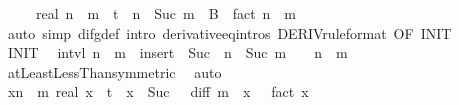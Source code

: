 \begin{isabellebody}
\ \ \ \ \ real\ {\isacharparenleft}{\kern0pt}n\ {\isacharminus}{\kern0pt}\ m{\isacharparenright}{\kern0pt}\ {\isacharasterisk}{\kern0pt}\ t\ {\isacharcircum}{\kern0pt}\ {\isacharparenleft}{\kern0pt}n\ {\isacharminus}{\kern0pt}\ Suc\ m{\isacharparenright}{\kern0pt}\ {\isacharasterisk}{\kern0pt}\ B\ {\isacharslash}{\kern0pt}\ fact\ {\isacharparenleft}{\kern0pt}n\ {\isacharminus}{\kern0pt}\ m{\isacharparenright}{\kern0pt}{\isacharparenright}{\kern0pt}{\isachardoublequoteclose}\isanewline
\ \ \ \ \isamarkupfalse%
\ {\isacharparenleft}{\kern0pt}auto\ simp{\isacharcolon}{\kern0pt}\ difg{\isacharunderscore}{\kern0pt}def\ intro{\isacharbang}{\kern0pt}{\isacharcolon}{\kern0pt}\ derivative{\isacharunderscore}{\kern0pt}eq{\isacharunderscore}{\kern0pt}intros\ DERIV{\isacharbrackleft}{\kern0pt}rule{\isacharunderscore}{\kern0pt}format{\isacharcomma}{\kern0pt}\ OF\ INIT{}{\isacharbrackright}{\kern0pt}{\isacharparenright}{\kern0pt}\isanewline
\ \ \isamarkupfalse%
\isanewline
\ \ \isamarkupfalse%
\ INIT{}\ \isamarkupfalse%
\ intvl{\isacharcolon}{\kern0pt}\ {\isachardoublequoteopen}{\isacharbraceleft}{\kern0pt}{\isachardot}{\kern0pt}{\isachardot}{\kern0pt}{\isacharless}{\kern0pt}n\ {\isacharminus}{\kern0pt}\ m{\isacharbraceright}{\kern0pt}\ {\isacharequal}{\kern0pt}\ insert\ {}\ {\isacharparenleft}{\kern0pt}Suc\ {\isacharbackquote}{\kern0pt}\ {\isacharbraceleft}{\kern0pt}{\isachardot}{\kern0pt}{\isachardot}{\kern0pt}{\isacharless}{\kern0pt}n\ {\isacharminus}{\kern0pt}\ Suc\ m{\isacharbraceright}{\kern0pt}{\isacharparenright}{\kern0pt}{\isachardoublequoteclose}\ \ {\isachardoublequoteopen}{}\ {\isacharless}{\kern0pt}\ n\ {\isacharminus}{\kern0pt}\ m{\isachardoublequoteclose}\isanewline
\ \ \ \ \isamarkupfalse%
\ atLeast{}LessThan{\isacharbrackleft}{\kern0pt}symmetric{\isacharbrackright}{\kern0pt}\ \isamarkupfalse%
\ auto\isanewline
\ \ \isamarkupfalse%
\ {\isachardoublequoteopen}{\isacharparenleft}{\kern0pt}{\isasymSum}x{\isacharless}{\kern0pt}n\ {\isacharminus}{\kern0pt}\ m{\isachardot}{\kern0pt}\ real\ x\ {\isacharasterisk}{\kern0pt}\ t\ {\isacharcircum}{\kern0pt}\ {\isacharparenleft}{\kern0pt}x\ {\isacharminus}{\kern0pt}\ Suc\ {}{\isacharparenright}{\kern0pt}\ {\isacharasterisk}{\kern0pt}\ diff\ {\isacharparenleft}{\kern0pt}m\ {\isacharplus}{\kern0pt}\ x{\isacharparenright}{\kern0pt}\ {}\ {\isacharslash}{\kern0pt}\ fact\ x{\isacharparenright}{\kern0pt}\ {\isacharequal}{\kern0pt}\isanewline

\end{isabellebody}

